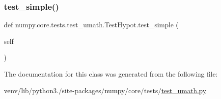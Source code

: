 \subsubsection{\texorpdfstring{test\+\_\+simple()}{test\_simple()}}
{\footnotesize\ttfamily def numpy.\+core.\+tests.\+test\+\_\+umath.\+Test\+Hypot.\+test\+\_\+simple (\begin{DoxyParamCaption}\item[{}]{self }\end{DoxyParamCaption})}



The documentation for this class was generated from the following file\+:\begin{DoxyCompactItemize}
\item 
venv/lib/python3./site-\/packages/numpy/core/tests/\hyperlink{test__umath_8py}{test\+\_\+umath.\+py}\end{DoxyCompactItemize}

